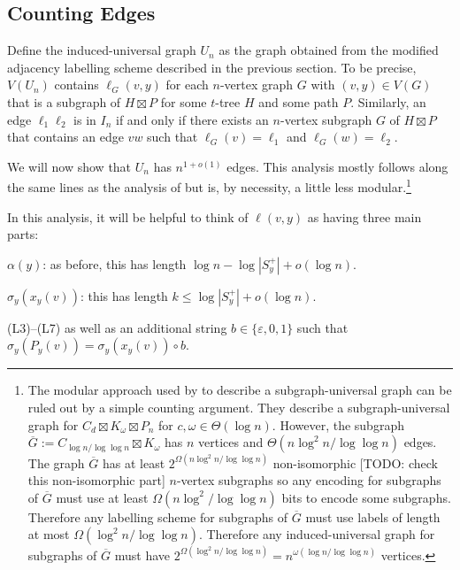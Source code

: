 \documentclass{article}
\begin{document}
\subsection{Counting Edges}

Define the induced-universal graph $U_n$ as the graph obtained from the modified adjacency labelling scheme described in the previous section.  To be precise, $V(U_n)$ contains $\ell_G(v,y)$ for each $n$-vertex graph $G$ with $(v,y)\in V(G)$ that is a subgraph of $H\boxtimes P$ for some $t$-tree $H$ and some path $P$.  Similarly, an edge $\ell_1\ell_2$ is in $I_n$ if and only if there exists an $n$-vertex subgraph $G$ of $H\boxtimes P$ that contains an edge $vw$ such that $\ell_G(v)=\ell_1$ and $\ell_G(w)=\ell_2$.

We will now show that $U_n$ has $n^{1+o(1)}$ edges.  This analysis mostly follows along the same lines as the analysis of \citet{esperet.joret.ea:sparse} but is, by necessity, a little less modular.\footnote{The modular approach used by \citet{esperet.joret.ea:sparse} to describe a subgraph-universal graph can be ruled out by a simple counting argument.  They describe a subgraph-universal graph for $C_d\boxtimes K_\omega\boxtimes P_n$ for $c,\omega\in\Theta(\log n)$.  However, the subgraph $\overline{G}:=C_{\log n/\log\log n}\boxtimes K_\omega$ has $n$ vertices and $\Theta(n\log^2 n/\log\log n)$ edges.  The graph $\overline{G}$ has at least $2^{\Omega(n\log^2 n/\log\log n)}$ non-isomorphic [TODO: check this non-isomorphic part] $n$-vertex subgraphs so any encoding for subgraphs of $\overline{G}$ must use at least $\Omega(n\log^2/\log\log n)$ bits to encode some subgraphs.  Therefore any labelling scheme for subgraphs of $\overline{G}$ must use labels of length at most $\Omega(\log^2 n/\log\log n)$.  Therefore any induced-universal graph for subgraphs of $\overline{G}$ must have $2^{\Omega(\log^2 n/\log\log n)}=n^{\omega(\log n/\log\log n)}$ vertices.}

In this analysis, it will be helpful to think of $\ell(v,y)$ as having three main parts:
\begin{compactenum}[(L1$^\star$)]
    \item $\alpha(y)$: as before, this has length $\log n-\log |S^+_y| + o(\log n)$.
    \item $\sigma_y(x_y(v))$: this has length $k\le \log |S^+_y| + o(\log n)$.
    \item (L3)--(L7) as well as an additional string $b\in\{\varepsilon, 0, 1\}$ such that $\sigma_y(P_y(v)) = \sigma_y(x_y(v))\mathbin{\circ} b$.
\end{compactenum}
\end{document}
